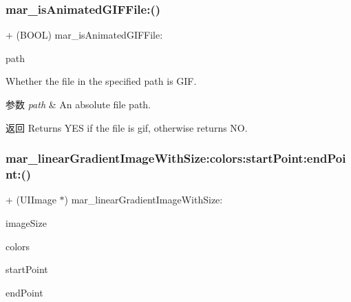 \subsubsection{\texorpdfstring{mar\+\_\+is\+Animated\+G\+I\+F\+File\+:()}{mar\_isAnimatedGIFFile:()}}
{\footnotesize\ttfamily + (B\+O\+OL) mar\+\_\+is\+Animated\+G\+I\+F\+File\+: \begin{DoxyParamCaption}\item[{(N\+S\+String $\ast$)}]{path }\end{DoxyParamCaption}}

Whether the file in the specified path is G\+IF.


\begin{DoxyParams}{参数}
{\em path} & An absolute file path.\\
\hline
\end{DoxyParams}
\begin{DoxyReturn}{返回}
Returns Y\+ES if the file is gif, otherwise returns NO. 
\end{DoxyReturn}
\mbox{\label{category_u_i_image_07_m_a_r_e_x_08_a678b5b9fdfd2c26b9f4d3af3ceeb6c0b}} 
\subsubsection{\texorpdfstring{mar\+\_\+linear\+Gradient\+Image\+With\+Size\+:colors\+:start\+Point\+:end\+Point\+:()}{mar\_linearGradientImageWithSize:colors:startPoint:endPoint:()}}
{\footnotesize\ttfamily + (U\+I\+Image $\ast$) mar\+\_\+linear\+Gradient\+Image\+With\+Size\+: \begin{DoxyParamCaption}\item[{(C\+G\+Size)}]{image\+Size }\item[{colors:(N\+S\+Array$\ast$)}]{colors }\item[{startPoint:(C\+G\+Point)}]{start\+Point }\item[{endPoint:(C\+G\+Point)}]{end\+Point }\end{DoxyParamCaption}}


